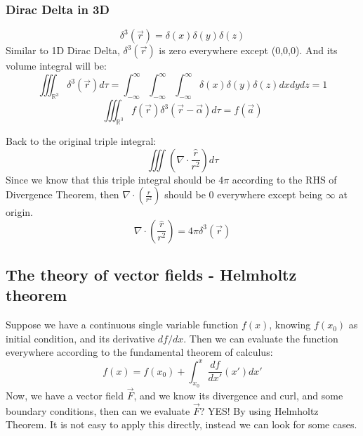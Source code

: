 \documentclass[12pt,a4paper,twoside]{article}
\numberwithin{equation}{section}
\begin{document}
	\subsubsection{Dirac Delta in 3D}
	\begin{equation}
	   \delta^3(\overrightarrow{r}) = \delta(x)\delta(y)\delta(z)
	\end{equation}
	Similar to 1D Dirac Delta, \(\delta^3(\overrightarrow{r})\) is zero everywhere except (0,0,0). And its volume integral will be:
	\begin{equation}
	    \iiint_{\mathbb{R}^3}\delta^3(\overrightarrow{r})d\tau = \int_{-\infty}^{\infty}\int_{-\infty}^{\infty}\int_{-\infty}^{\infty}\delta(x)\delta(y)\delta(z)dxdydz = 1
	\end{equation}
	\begin{equation}
	    \iiint_{\mathbb{R}^3}f(\overrightarrow{r})\delta^3(\overrightarrow{r}-\overrightarrow{\alpha})d\tau = f(\overrightarrow{a})
	\end{equation}
	
	\noindent Back to the original triple integral:
	\[\iiint (\nabla\cdot \frac{\hat{r}}{r^2})d\tau\]
	Since we know that this triple integral should be $4\pi$ according to the RHS of Divergence Theorem, then \(\nabla\cdot (\frac{\hat{r}}{r^2})\) should be 0 everywhere except being $\infty$ at origin.
	\[\nabla\cdot(\frac{\hat{r}}{r^2})=4\pi \delta^3(\overrightarrow{r})\]
	
	
	\subsection{The theory of vector fields - Helmholtz theorem}
	Suppose we have a continuous single variable function $f(x)$, knowing $f(x_0)$ as initial condition, and its derivative $df/dx$. Then we can evaluate the function everywhere according to the fundamental theorem of calculus:
	\[f(x)=f(x_0)+\int_{x_0}^{x}\frac{df}{dx'}(x')dx'\]
    Now, we have a vector field \(\overrightarrow{F}\), and we know its divergence and curl, and some boundary conditions, then can we evaluate \(\overrightarrow{F}\)? YES! By using Helmholtz Theorem. It is not easy to apply this directly, instead we can look for some cases.\\
	
\end{document}
